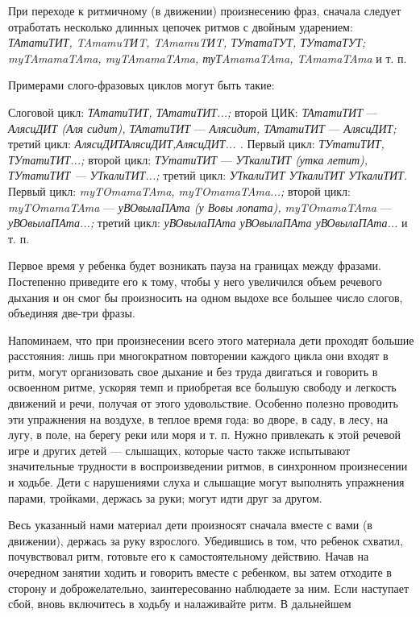 \documentclass[a5paper]{book}
\renewcommand{\emph}[1]{\textit{#1}}
\begin{document}
При переходе к ритмичному (в движении) произнесению фраз, сначала
следует отработать несколько длинных цепочек ритмов с двойным ударением:
\emph{ТАтатиТИТ, TAmamuTИT, TAmamuTИT, ТУтатаТУТ, ТУтатаТУТ;
myTAmamaTAma, myTAmamaTAma, туТAmamaTAma, TAmamaTAma} и т. п.

Примерами слого-фразовых циклов могут быть такие:

Слоговой цикл: \emph{ТАтатиТИТ, ТАтатиТИТ...;} второй ЦИК:
\emph{ТАтатиТИТ} --- \emph{АлясиДИТ (Аля сидит), ТАтатиТИТ} ---
\emph{Алясидит, ТАтатиТИТ} --- \emph{АлясиДИТ;} третий цикл:
\emph{АлясиДИТАлясиДИТ,АлясиДИТ... .} Первый цикл: \emph{ТУтатиТИТ,
ТУтатиТИТ...;} второй цикл: \emph{ТУтатиТИТ} --- \emph{УТкалиТИТ (утка
летит), ТУтатиТИТ --- УТкалиТИТ...;} третий цикл: \emph{УТкалиТИТ
УТкалиТИТ УТкалиТИТ.} Первый цикл: \emph{myTOmamaTAma, myTOmamaTAma...;}
второй цикл: \emph{myTOmamaTAma} --- \emph{уВОвылаПАта (у Вовы лопата),
myTOmamaTAma} --- \emph{уВОвылаПАта...;} третий цикл: \emph{уВОвылаПАта
уВОвылаПАта уВОвылаПАта...} и т. п.

Первое время у ребенка будет возникать пауза на границах между фразами.
Постепенно приведите его к тому, чтобы у него увеличился объем речевого
дыхания и он смог бы произносить на одном выдохе все большее число
слогов, объединяя две-три фразы.

Напоминаем, что при произнесении всего этого материала дети проходят
большие расстояния: лишь при многократном повторении каждого цикла они
входят в ритм, могут организовать свое дыхание и без труда двигаться и
говорить в освоенном ритме, ускоряя темп и приобретая все большую
свободу и легкость движений и речи, получая от этого удовольствие.
Особенно полезно проводить эти упражнения на воздухе, в теплое время
года: во дворе, в саду, в лесу, на лугу, в поле, на берегу реки или моря
и т. п. Нужно привлекать к этой речевой игре и других детей ---
слышащих, которые часто также испытывают значительные трудности в
воспроизведении ритмов, в синхронном произнесении и ходьбе. Дети с
нарушениями слуха и слышащие могут выполнять упражнения парами,
тройками, держась за руки; могут идти друг за другом.

Весь указанный нами материал дети произносят сначала вместе с вами (в
движении), держась за руку взрослого. Убедившись в том, что ребенок
схватил, почувствовал ритм, готовьте его к самостоятельному действию.
Начав на очередном занятии ходить и говорить вместе с ребенком, вы затем
отходите в сторону и доброжелательно, заинтересованно наблюдаете за ним.
Если наступает сбой, вновь включитесь в ходьбу и налаживайте ритм. В
дальнейшем
\end{document}
